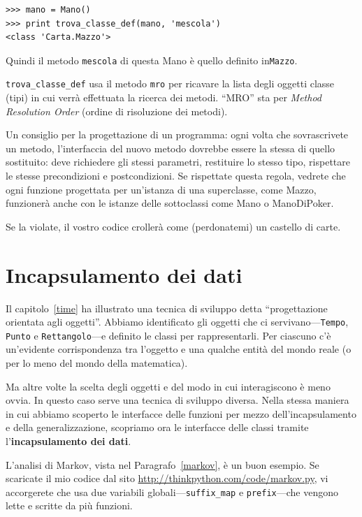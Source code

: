\documentclass[10pt]{book}
\begin{document}
\begin{verbatim}
>>> mano = Mano()
>>> print trova_classe_def(mano, 'mescola')
<class 'Carta.Mazzo'>
\end{verbatim}
%
Quindi il metodo {\tt mescola} di questa Mano è quello definito in{\tt Mazzo}.

\verb"trova_classe_def" usa il metodo {\tt mro} per ricavare la lista degli oggetti classe (tipi) in cui verrà effettuata la ricerca dei metodi.  ``MRO'' sta per {\em Method Resolution Order} (ordine di risoluzione dei metodi).

Un consiglio per la progettazione di un programma: ogni volta che sovrascrivete un metodo, l'interfaccia del nuovo metodo dovrebbe essere la stessa di quello sostituito: deve richiedere gli stessi parametri, restituire lo stesso tipo, rispettare le stesse precondizioni e postcondizioni. Se rispettate questa regola, vedrete che ogni funzione progettata per un'istanza di una superclasse, come Mazzo, funzionerà anche con le istanze delle sottoclassi come Mano o ManoDiPoker.

Se la violate, il vostro codice crollerà come (perdonatemi) un castello di carte.


\section{Incapsulamento dei dati}

Il capitolo~\ref{time} ha illustrato una tecnica di sviluppo detta
``progettazione orientata agli oggetti''.  Abbiamo identificato gli oggetti che ci servivano---{\tt  Tempo}, {\tt Punto} e {\tt Rettangolo}---e definito le classi per rappresentarli. Per ciascuno c'è un'evidente corrispondenza tra l'oggetto e una qualche entità del mondo reale (o per lo meno del mondo della matematica).

Ma altre volte la scelta degli oggetti e del modo in cui interagiscono è meno ovvia. In questo caso serve una tecnica di sviluppo diversa. Nella stessa maniera in cui abbiamo scoperto le interfacce delle funzioni per mezzo dell'incapsulamento e della generalizzazione, scopriamo ora le interfacce delle classi tramite l'{\bf incapsulamento dei dati}.

L'analisi di Markov, vista nel Paragrafo~\ref{markov}, è un buon esempio. Se scaricate il mio codice dal sito \url{http://thinkpython.com/code/markov.py}, vi accorgerete che usa due variabili globali---\verb"suffix_map" e \verb"prefix"---che vengono lette e scritte da più funzioni.
\end{document}
